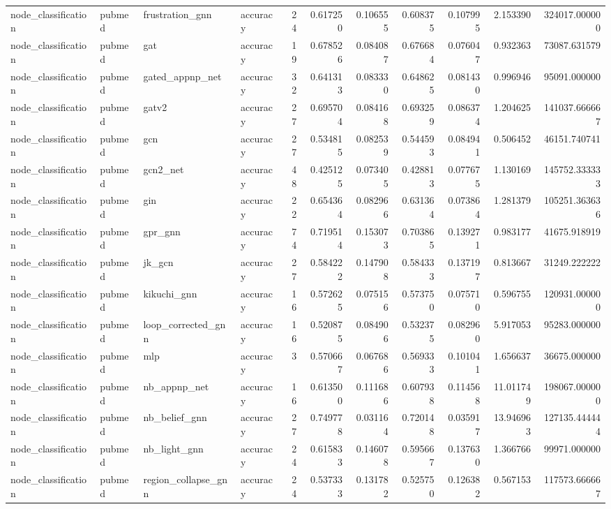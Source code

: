 \begin{tabular}{llllrrrrrrr}
node_classification & pubmed & frustration_gnn & accuracy & 24 & 0.617250 & 0.106555 & 0.608375 & 0.107995 & 2.153390 & 324017.000000 \\
node_classification & pubmed & gat & accuracy & 19 & 0.678526 & 0.084087 & 0.676684 & 0.076047 & 0.932363 & 73087.631579 \\
node_classification & pubmed & gated_appnp_net & accuracy & 32 & 0.641313 & 0.083330 & 0.648625 & 0.081430 & 0.996946 & 95091.000000 \\
node_classification & pubmed & gatv2 & accuracy & 27 & 0.695704 & 0.084168 & 0.693259 & 0.086374 & 1.204625 & 141037.666667 \\
node_classification & pubmed & gcn & accuracy & 27 & 0.534815 & 0.082539 & 0.544593 & 0.084941 & 0.506452 & 46151.740741 \\
node_classification & pubmed & gcn2_net & accuracy & 48 & 0.425125 & 0.073405 & 0.428813 & 0.077675 & 1.130169 & 145752.333333 \\
node_classification & pubmed & gin & accuracy & 22 & 0.654364 & 0.082966 & 0.631364 & 0.073864 & 1.281379 & 105251.363636 \\
node_classification & pubmed & gpr_gnn & accuracy & 74 & 0.719514 & 0.153073 & 0.703865 & 0.139271 & 0.983177 & 41675.918919 \\
node_classification & pubmed & jk_gcn & accuracy & 27 & 0.584222 & 0.147908 & 0.584333 & 0.137197 & 0.813667 & 31249.222222 \\
node_classification & pubmed & kikuchi_gnn & accuracy & 16 & 0.572625 & 0.075156 & 0.573750 & 0.075710 & 0.596755 & 120931.000000 \\
node_classification & pubmed & loop_corrected_gnn & accuracy & 16 & 0.520875 & 0.084906 & 0.532375 & 0.082960 & 5.917053 & 95283.000000 \\
node_classification & pubmed & mlp & accuracy & 3 & 0.570667 & 0.067686 & 0.569333 & 0.101041 & 1.656637 & 36675.000000 \\
node_classification & pubmed & nb_appnp_net & accuracy & 16 & 0.613500 & 0.111686 & 0.607938 & 0.114568 & 11.011749 & 198067.000000 \\
node_classification & pubmed & nb_belief_gnn & accuracy & 27 & 0.749778 & 0.031164 & 0.720148 & 0.035917 & 13.946963 & 127135.444444 \\
node_classification & pubmed & nb_light_gnn & accuracy & 24 & 0.615833 & 0.146078 & 0.595667 & 0.137630 & 1.366766 & 99971.000000 \\
node_classification & pubmed & region_collapse_gnn & accuracy & 24 & 0.537333 & 0.131782 & 0.525750 & 0.126382 & 0.567153 & 117573.666667 \\

\end{tabular}
